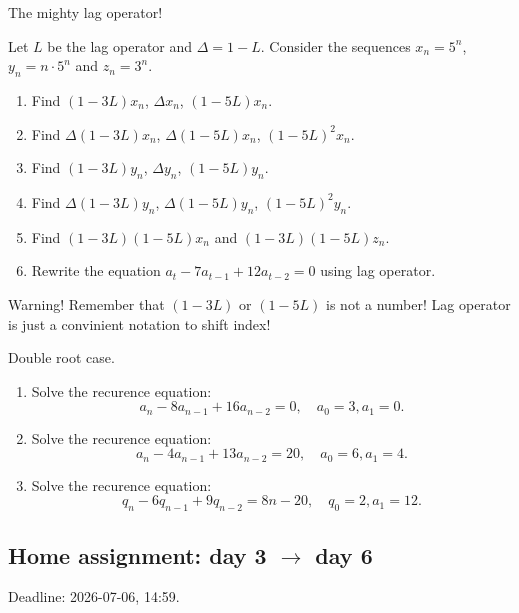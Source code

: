 \documentclass[12pt]{article}
\begin{document}
\begin{exercise}
    The mighty lag operator!

    Let $L$ be the lag operator and $\Delta = 1 - L$. Consider the sequences $x_n = 5^n$, $y_n = n\cdot 5^n$ and $z_n = 3^n$.
    \begin{enumerate}[label=\alph*)]
        \item Find $(1 - 3L)x_n$, $\Delta x_n$, $(1 - 5L)x_n$.
        \item Find $\Delta (1 - 3L) x_n$, $\Delta (1- 5L)x_n$, $(1 - 5L)^2 x_n$.
        \item Find $(1 - 3L)y_n$, $\Delta y_n$, $(1 - 5L)y_n$.
        \item Find $\Delta (1 - 3L) y_n$, $\Delta (1- 5L)y_n$, $(1 - 5L)^2 y_n$.
        \item Find $(1 - 3 L)(1 - 5L) x_n$ and $(1 - 3L)(1 - 5L) z_n$.
        \item Rewrite the equation $a_t - 7a_{t-1} + 12 a_{t-2} = 0$ using lag operator. 
    \end{enumerate}

Warning! Remember that $(1 - 3L)$ or $(1 - 5L)$ is not a number! Lag operator is just a convinient notation to shift index!
\end{exercise}


\begin{exercise}
Double root case. 
\begin{enumerate}[label=\alph*)]
    \item Solve the recurence equation:
    \[
    a_n - 8 a_{n-1} + 16 a_{n-2} = 0, \quad a_0 = 3, a_1 = 0.
    \]
    \item Solve the recurence equation:
    \[
    a_n - 4 a_{n-1} + 13 a_{n-2} = 20, \quad a_0 = 6, a_1 = 4.
    \]
    \item Solve the recurence equation:
    \[
    q_n - 6 q_{n-1} + 9q_{n-2} = 8n - 20, \quad q_0 = 2, a_1 = 12.
    \]
\end{enumerate}

\end{exercise}


\subsection*{Home assignment: day 3 $\to$ day 6}

Deadline: 2026-07-06, 14:59. 
\end{document}
